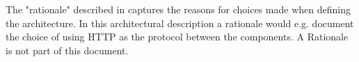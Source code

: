 \documentclass[a4paper,10pt]{article}
\begin{document}
The "rationale" described in \cite{perrywolf1992} captures the reasons for choices
made when defining the architecture. In this architectural description a rationale
would e.g. document the choice of using HTTP as the protocol between the components. A
Rationale is not part of this document.




\end{document}

